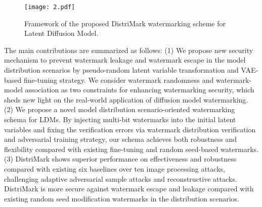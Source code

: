 





\begin{figure*}[t]
\centering
\texttt{[image: 2.pdf]} %
\caption{Framework of the proposed DistriMark watermarking scheme for Latent Diffusion Model.}
\label{fig2}
\end{figure*}


The main contributions are summarized as follows:
(1) We propose new security mechanism to prevent watermark leakage and watermark escape in the model distribution scenarios by pseudo-random latent variable transformation and VAE-based fine-tuning strategy. We consider watermark randomness and watermark-model association as two constraints for enhancing watermarking security, which sheds new light on the real-world application of diffusion model watermarking.
(2) We propose a novel model distribution scenario-oriented watermarking schema for LDMs. By injecting multi-bit watermarks into the initial latent variables and fixing the verification errors via watermark distribution verification and adversarial training strategy, our schema achieves both robustness and flexibility compared with existing fine-tuning and random seed-based watermarks.
(3) DistriMark shows superior performance on effectiveness and robustness compared with existing six baselines over ten image processing attacks, challenging adaptive adversarial sample attacks and reconstructive attacks. DistriMark is more secure against watermark escape and leakage compared with existing random seed modification watermarks in the distribution scenarios.


